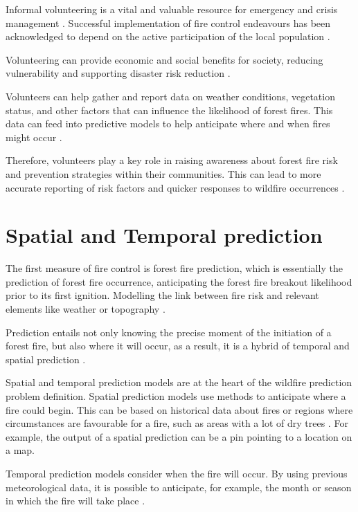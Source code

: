 Informal volunteering is a vital and valuable resource for emergency and crisis management \cite{aminizade2017role}. Successful implementation of fire control endeavours has been acknowledged to depend on the active participation of the local population \cite{Goldammer2023}.


Volunteering can provide economic and social benefits for society, reducing vulnerability and supporting disaster risk reduction \cite{aminizade2017role}.


Volunteers can help gather and report data on weather conditions, vegetation status, and other factors that can influence the likelihood of forest fires. This data can feed into predictive models to help anticipate where and when fires might occur \cite{artes2019global}.


Therefore, volunteers play a key role in raising awareness about forest fire risk and prevention strategies within their communities. This can lead to more accurate reporting of risk factors and quicker responses to wildfire occurrences \cite{li2023advances}.






\section{Spatial and Temporal prediction}
The first measure of fire control is forest fire prediction, which is essentially the prediction of forest fire occurrence, anticipating the forest fire breakout likelihood prior to its first ignition. Modelling the link between fire risk and relevant elements like weather or topography \cite{Abid2021}.


Prediction entails not only knowing the precise moment of the initiation of a forest fire, but also where it will occur, as a result, it is a hybrid of temporal and spatial prediction \cite{arif2021role}.


Spatial and temporal prediction models are at the heart of the wildfire prediction problem definition. Spatial prediction models use methods to anticipate where a fire could begin. This can be based on historical data about fires or regions where circumstances are favourable for a fire, such as areas with a lot of dry trees \cite{Cilli2022}. For example, the output of a spatial prediction can be a pin pointing to a location on a map. 


Temporal prediction models consider when the fire will occur. By using previous meteorological data, it is possible to anticipate, for example, the month or season in which the fire will take place \cite{su141610107}.
